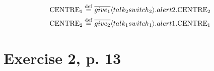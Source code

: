 \documentclass[11pt]{article}
\begin{document}
\begin{equation}
\begin{split}
{\rm CENTRE_1} \stackrel{\mathrm{def}}{=} \overline{give_1} \langle talk_2 switch_2 \rangle .alert2.{\rm CENTRE_2} \\ 
{\rm CENTRE_2} \stackrel{\mathrm{def}}{=} \overline{give_2} \langle talk_1 switch_1 \rangle .alert1.{\rm CENTRE_1}
\end{split}
\end{equation}


\section{Exercise 2, p. 13}

\end{document}
